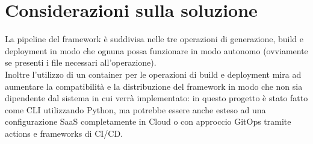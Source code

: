 \section{Considerazioni sulla soluzione}

La pipeline del framework è suddivisa nelle tre operazioni di generazione, build e deployment in modo che ognuna possa funzionare in modo autonomo (ovviamente se presenti i file necessari all'operazione).\\
Inoltre l'utilizzo di un container per le operazioni di build e deployment mira ad aumentare la compatibilità e la distribuzione del framework in modo che non sia dipendente dal sistema in cui verrà implementato: in questo progetto è stato fatto come CLI utilizzando Python, ma potrebbe essere anche esteso ad una configurazione SaaS completamente in Cloud o con approccio GitOps tramite actions e frameworks di CI/CD. 

